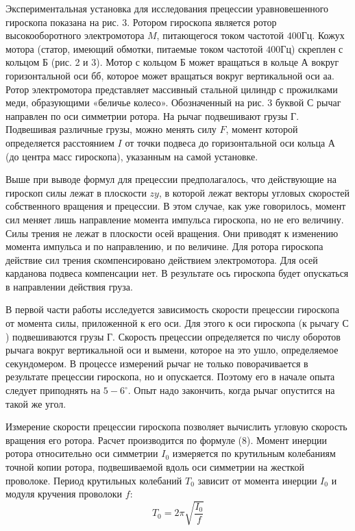 \documentclass[a4paper,12pt]{article} %
\begin{document}
Экспериментальная установка для исследования прецессии уравновешенного гироскопа показана на рис. 3. Ротором гироскопа является ротор высокооборотного электромотора $M$, питающегося током частотой $400\text{Гц}$. Кожух мотора (статор, имеющий обмотки, питаемые током частотой $400\text{Гц}$) скреплен с кольцом $\text{Б}$ (рис. 2 и 3). Мотор с кольцом $\text{Б}$ может вращаться в кольце $\text{А}$ вокруг горизонтальной оси $\text{бб}$, которое может вращаться вокруг вертикальной оси $\text{аа}$. Ротор электромотора представляет массивный стальной цилиндр с прожилками меди, образующими «беличье колесо». Обозначенный на рис. 3 буквой $\text{С}$ рычаг направлен по оси симметрии ротора. На рычаг подвешивают грузы $\text{Г}$. Подвешивая различные грузы, можно менять силу $F$, момент которой определяется расстоянием $I$ от точки подвеса до горизонтальной оси кольца $\text{А}$ (до центра масс гироскопа), указанным на самой установке.

Выше при выводе формул для прецессии предполагалось, что действующие на гироскоп силы лежат в плоскости $zy$, в которой лежат векторы угловых скоростей собственного вращения и прецессии. В этом случае, как уже говорилось, момент сил меняет лишь направление момента импульса гироскопа, но не его величину. Силы трения не лежат в плоскости осей вращения. Они приводят к изменению момента импульса и по направлению, и по величине. Для ротора гироскопа действие сил трения скомпенсировано действием электромотора. Для осей карданова подвеса компенсации нет. В результате ось гироскопа будет опускаться в направлении действия груза. 

В первой части работы исследуется зависимость скорости прецессии гироскопа от момента силы, приложенной к его оси. Для этого к оси гироскопа (к рычагу $\text{С}$) подвешиваются грузы $\text{Г}$. Скорость прецессии определяется по числу оборотов рычага вокруг вертикальной оси и вымени, которое на это ушло, определяемое секундомером. В процессе измерений рычаг не только поворачивается в результате прецессии гироскопа, но и опускается. Поэтому его в начале опыта следует приподнять на $5-6^\circ$. Опыт надо закончить, когда рычаг опустится на такой же угол.

Измерение скорости прецессии гироскопа позволяет вычислить угловую скорость вращения его ротора. Расчет производится по формуле (8). Момент инерции ротора относительно оси симметрии $I_0$ измеряется по крутильным колебаниям точной копии ротора, подвешиваемой вдоль оси симметрии на жесткой проволоке. Период крутильных колебаний $T_0$ зависит от момента инерции $I_0$ и модуля кручения проволоки $f$:
\begin{equation}
T_0 = 2\pi\sqrt{\frac{I_0}{f}}
\end{equation}
\end{document}

